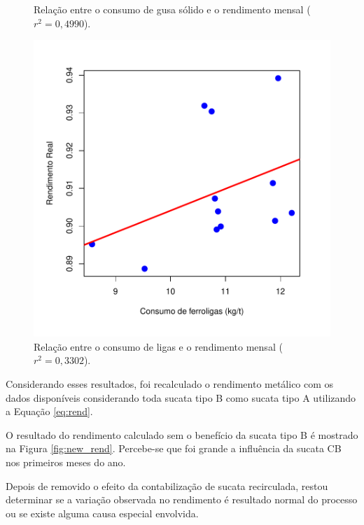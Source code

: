 \begin{multicols}{2}
\begin{figure}[H]
		\caption{Relação entre o consumo de gusa sólido e o rendimento mensal ($r^2=0,4990$).}
		\label{fig:sagp}
	\end{figure}
	\begin{figure}[H]
		\centering
		\includegraphics[scale=0.4, bb=0 0 432 432, trim=0in 0in 0in -107pt]{figures/fig10.pdf} %
		\caption{Relação entre o consumo de ligas e o rendimento mensal ($r^2=0,3302$).}
		\label{fig:ligas}
	\end{figure}			
\newpage
	Considerando esses resultados, foi recalculado o rendimento metálico com os dados disponíveis\cite{rel4} considerando toda sucata tipo B como sucata tipo A utilizando a Equação \ref{eq:rend}. 
		
	O resultado do rendimento calculado sem o benefício da sucata tipo B é mostrado na Figura \ref{fig:new_rend}. Percebe-se que foi grande a influência da sucata CB nos primeiros meses do ano. 

	Depois de removido o efeito da contabilização de sucata recirculada, restou determinar se a variação observada no rendimento é resultado normal do processo ou se existe alguma causa especial envolvida. 
	

\end{multicols}
